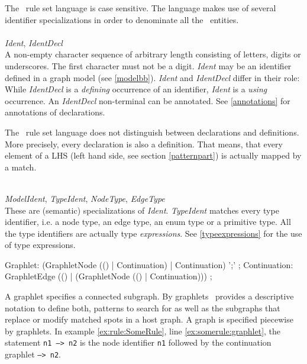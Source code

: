 The \GrG\ rule set language is case sensitive. The language makes use of several identifier specializations in order to denominate all the \GrG\ entities.\\
\\
\emph{Ident}, \emph{IdentDecl}\\ \nopagebreak
A non-empty character sequence of arbitrary length consisting of letters, digits or underscores. The first character must not be a digit. \emph{Ident} may be an identifier defined in a graph model (see \ref{modelbb}). \emph{Ident} and \emph{IdentDecl} differ in their role: While \emph{IdentDecl} is a \emph{defining} occurrence of an identifier, \emph{Ident} is a \emph{using} occurrence. An \emph{IdentDecl} non-terminal can be annotated. See \ref{annotations} for annotations of declarations.
\begin{note}
  The \GrG\ rule set language does not distinguish between declarations and definitions. More precisely, every declaration is also a definition. That means, that every element of a LHS (left hand side, see section \ref{patternpart}) is actually mapped by a match. 
\end{note}
\mbox{ }\\
\emph{ModelIdent}, \emph{TypeIdent}, \emph{NodeType}, \emph{EdgeType}\\
These are (semantic) specializations of \emph{Ident}. \emph{TypeIdent} matches every type identifier, i.e. a node type, an edge type, an enum type or a primitive type. All the type identifiers are actually type \emph{expressions}. See \ref{typeexpressions} for the use of type expressions.\\

\begin{rail}
  Graphlet: (GraphletNode (() | Continuation) | Continuation) ';' ;
  Continuation: GraphletEdge (() | (GraphletNode (() | Continuation))) ;
\end{rail}
A graphlet specifies a connected subgraph. 
By graphlets \GrG\ provides a descriptive notation to define both, patterns to search for as well as the subgraphs that replace or modify matched spots in a host graph. 
A graph is specified piecewise by graphlets. 
In example \ref{ex:rule:SomeRule}, line \ref{ex:somerule:graphlet}, the statement \texttt{n1 --> n2} is the node identifier \texttt{n1} followed by the continuation graphlet \texttt{--> n2}.

